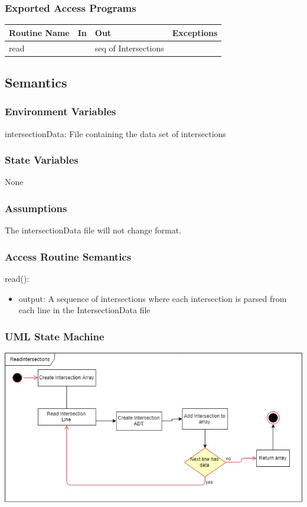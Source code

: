 \documentclass[12pt]{article}
\begin{document}
\subsubsection*{Exported Access Programs}
    \begin{tabular}{|l|l|l|l|}
    \hline
    \textbf{Routine Name} & \textbf{In} & \textbf{Out} & \textbf{Exceptions}\\
    \hline
    read & ~ & seq of Intersections & ~\\
    \hline
    \end{tabular}
    
\subsection*{Semantics}
\subsubsection*{Environment Variables}
intersectionData: File containing the data set of intersections

\subsubsection*{State Variables}
None

\subsubsection*{Assumptions}
The intersectionData file will not change format.

\subsubsection*{Access Routine Semantics}

read():
\begin{itemize}
    \item output: A sequence of intersections where each intersection is parsed from each line in the IntersectionData file
\end{itemize}

\subsubsection*{UML State Machine}
\includegraphics[scale=0.625]{UMLSM-ReadIntersections.png}
\end{document}
